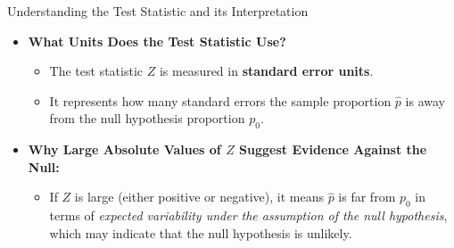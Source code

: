 \documentclass[handout]{beamer} %
\begin{document}
\begin{frame}{Understanding the Test Statistic and its Interpretation}
    \begin{itemize}
        \item \textbf{What Units Does the Test Statistic Use?}
        \begin{itemize}
            \item The test statistic $Z$ is measured in \textbf{standard error units}.
            \item It represents how many standard errors the sample proportion $\hat{p} $ is away from the null hypothesis proportion $p_0$.
        \end{itemize}

        \item \textbf{Why Large Absolute Values of $Z$ Suggest Evidence Against the Null:}
        \begin{itemize}
            \item If $Z$ is large (either positive or negative), it means $\hat{p}$ is far from $p_0$ in terms of \emph{expected variability under the assumption of the null hypothesis}, which may indicate that the null hypothesis is unlikely.
        \end{itemize}
    \end{itemize}
\end{frame}
\end{document}
